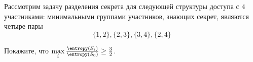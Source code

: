 Рассмотрим задачу разделения секрета для следующей структуры доступа с $4$ участниками: минимальными
группами участников, знающих секрет, являются четыре пары
$$
    \{1, 2\}, \{2, 3\}, \{3, 4\}, \{2, 4\}
$$

Покажите, что $\max\limits_i \frac{\entropy(S_i)}{\entropy(S_0)} \ge \frac{3}{2}$.
    